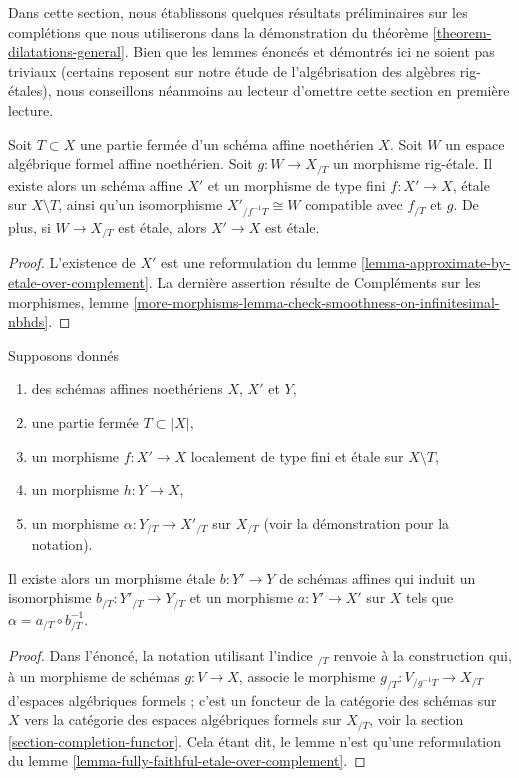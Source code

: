 \noindent
Dans cette section, nous établissons quelques résultats préliminaires sur les
complétions que nous utiliserons dans la démonstration du
théorème \ref{theorem-dilatations-general}.
Bien que les lemmes énoncés et démontrés ici ne soient pas triviaux
(certains reposent sur notre étude de l'algébrisation des algèbres rig-étales),
nous conseillons néanmoins au lecteur d'omettre cette section en première lecture.

\begin{lemma}
\label{lemma-algebraize-rig-etale-affine}
Soit $T \subset X$ une partie fermée d'un schéma affine noethérien $X$.
Soit $W$ un espace algébrique formel affine noethérien.
Soit $g : W \to X_{/T}$ un morphisme rig-étale. Il existe alors
un schéma affine $X'$ et un morphisme de type fini $f : X' \to X$,
étale sur $X \setminus T$, ainsi qu'un isomorphisme
$X'_{/f^{-1}T} \cong W$ compatible avec $f_{/T}$ et $g$.
De plus, si $W \to X_{/T}$ est étale, alors $X' \to X$ est étale.
\end{lemma}

\begin{proof}
L'existence de $X'$ est une reformulation du
lemme \ref{lemma-approximate-by-etale-over-complement}.
La dernière assertion résulte de
Compléments sur les morphismes, lemme
\ref{more-morphisms-lemma-check-smoothness-on-infinitesimal-nbhds}.
\end{proof}

\begin{lemma}
\label{lemma-algebraize-morphism-rig-etale}
Supposons donnés
\begin{enumerate}
\item des schémas affines noethériens $X$, $X'$ et $Y$,
\item une partie fermée $T \subset |X|$,
\item un morphisme $f : X' \to X$ localement de type fini
et étale sur $X \setminus T$,
\item un morphisme $h : Y \to X$,
\item un morphisme $\alpha : Y_{/T} \to X'_{/T}$ sur $X_{/T}$
(voir la démonstration pour la notation).
\end{enumerate}
Il existe alors un morphisme étale $b : Y' \to Y$ de schémas affines
qui induit un isomorphisme $b_{/T} : Y'_{/T} \to Y_{/T}$
et un morphisme $a : Y' \to X'$ sur $X$
tels que $\alpha = a_{/T} \circ b_{/T}^{-1}$.
\end{lemma}

\begin{proof}
Dans l'énoncé, la notation utilisant l'indice ${}_{/T}$ renvoie à la
construction qui, à un morphisme de schémas $g : V \to X$,
associe le morphisme $g_{/T} : V_{/g^{-1}T} \to X_{/T}$ d'espaces
algébriques formels ; c'est un foncteur de la catégorie des schémas sur $X$
vers la catégorie des espaces algébriques formels sur $X_{/T}$, voir la
section \ref{section-completion-functor}.
Cela étant dit, le lemme n'est qu'une reformulation du
lemme \ref{lemma-fully-faithful-etale-over-complement}.
\end{proof}

